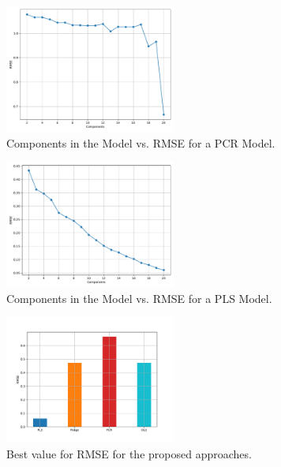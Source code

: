 \begin{figure}[htbp!]
  \centerline{\includegraphics[width=0.5\textwidth]{../../code/hw2/figures/5-PCR-RMSE.pdf}}
  \caption{Components in the Model vs. RMSE for a PCR Model.}
  \label{fig:5-PCR-RMSE}
\end{figure}

\begin{figure}[htbp!]
  \centerline{\includegraphics[width=0.5\textwidth]{../../code/hw2/figures/5-PLS-RMSE.pdf}}
  \caption{Components in the Model vs. RMSE for a PLS Model.}
  \label{fig:5-PLS-RMSE}
\end{figure}


\begin{figure}[htbp!]
  \centerline{\includegraphics[width=0.5\textwidth]{../../code/hw2/figures/5-summary.pdf}}
  \caption{Best value for RMSE for the proposed approaches.}
  \label{fig:5-summary}
\end{figure}


